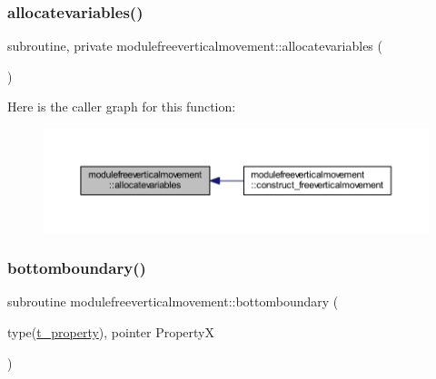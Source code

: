 \subsubsection{\texorpdfstring{allocatevariables()}{allocatevariables()}}
{\footnotesize\ttfamily subroutine, private modulefreeverticalmovement\+::allocatevariables (\begin{DoxyParamCaption}{ }\end{DoxyParamCaption})\hspace{0.3cm}{\ttfamily [private]}}

Here is the caller graph for this function\+:\nopagebreak
\begin{figure}[H]
\begin{center}
\leavevmode
\includegraphics[width=350pt]{namespacemodulefreeverticalmovement_a7ec18a4b674d7b9ea1339f2a93116e0a_icgraph}
\end{center}
\end{figure}
\mbox{\label{namespacemodulefreeverticalmovement_ad4e1681fa973f2a527c8fb380ad6fa31}} 
\subsubsection{\texorpdfstring{bottomboundary()}{bottomboundary()}}
{\footnotesize\ttfamily subroutine modulefreeverticalmovement\+::bottomboundary (\begin{DoxyParamCaption}\item[{type(\mbox{\hyperlink{structmodulefreeverticalmovement_1_1t__property}{t\+\_\+property}}), pointer}]{PropertyX }\end{DoxyParamCaption})\hspace{0.3cm}{\ttfamily [private]}}


